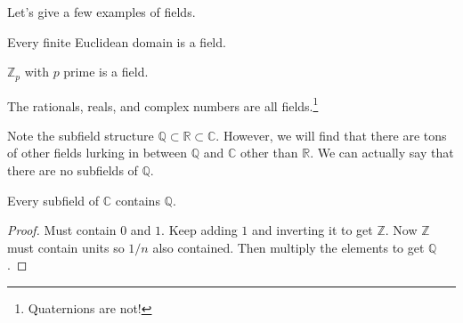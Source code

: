   Let's give a few examples of fields. 

  \begin{theorem}
    Every finite Euclidean domain is a field. 
  \end{theorem} 

  \begin{example}
    $\mathbb{Z}_p$ with $p$ prime is a field. 
  \end{example}

  \begin{example}[Numbers]
    The rationals, reals, and complex numbers are all fields.\footnote{Quaternions are not!}
  \end{example}

  Note the subfield structure $\mathbb{Q} \subset \mathbb{R} \subset \mathbb{C}$. However, we will find that there are tons of other fields lurking in between $\mathbb{Q}$ and $\mathbb{C}$ other than $\mathbb{R}$. We can actually say that there are no subfields of $\mathbb{Q}$. 

  \begin{lemma}
    Every subfield of $\mathbb{C}$ contains $\mathbb{Q}$. 
  \end{lemma}
  \begin{proof}
    Must contain $0$ and $1$. Keep adding $1$ and inverting it to get $\mathbb{Z}$. Now $\mathbb{Z}$ must contain units so $1/n$ also contained. Then multiply the elements to get $\mathbb{Q}$. 
  \end{proof} 


